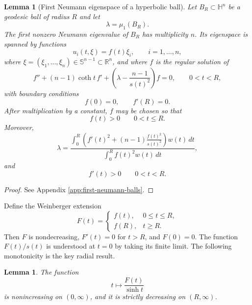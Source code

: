 \documentclass[11pt]{amsart}
\newtheorem{lemma}[theorem]{Lemma}
\theoremstyle{remark}
\newcommand{\HH}{\mathbb H}
\newcommand{\RR}{\mathbb R}
\newcommand{\Sn}{\mathbb S}
\begin{document}
\begin{lemma}[First Neumann eigenspace of a hyperbolic ball]\label{lem:hyperbolic-ball-facts}
Let $B_R\subset\HH^n$ be a geodesic ball of radius $R$ and let
$$
        \lambda=\mu_1(B_R).
$$
The first nonzero Neumann eigenvalue of $B_R$ has multiplicity $n$.  Its eigenspace is spanned by functions
$$
        u_i(t,\xi)=f(t)\xi_i,
        \qquad i=1,\dots,n,
$$
where $\xi=(\xi_1,\dots,\xi_n)\in\Sn^{n-1}\subset\RR^n$, and where $f$ is the regular solution of
\begin{equation}\label{eq:hyperbolic-ball-ode}
        f''+(n-1)\coth t\,f'
        +\left(\lambda-\frac{n-1}{s(t)^2}\right)f=0,
        \qquad 0<t<R,
\end{equation}
with boundary conditions
\begin{equation}\label{eq:hyperbolic-ball-bc}
        f(0)=0,
        \qquad
        f'(R)=0.
\end{equation}
After multiplication by a constant, $f$ may be chosen so that
$$
        f(t)>0\qquad 0<t\le R.
$$
Moreover,
\begin{equation}\label{eq:hyperbolic-ball-rayleigh}
        \lambda
        =\frac{\displaystyle\int_0^R\left(f'(t)^2+(n-1)\frac{f(t)^2}{s(t)^2}\right)w(t)\,dt}
        {\displaystyle\int_0^R f(t)^2w(t)\,dt},
\end{equation}
and
\begin{equation}\label{eq:hyperbolic-f-prime-positive}
        f'(t)>0\qquad 0<t<R.
\end{equation}
\end{lemma}

\begin{proof}
See Appendix \ref{app:first-neumann-balls}.
\end{proof}

Define the Weinberger extension
\begin{equation}\label{eq:hyperbolic-F-def}
        F(t)=
        \begin{cases}
        f(t),&0\le t\le R,\\
        f(R),&t\ge R.
        \end{cases}
\end{equation}
Then $F$ is nondecreasing, $F'(t)=0$ for $t>R$, and $F(0)=0$.  The function $F(t)/s(t)$ is understood at $t=0$ by taking its finite limit.  The following monotonicity is the key radial result.

\begin{lemma}\label{lem:hyperbolic-F-over-sinh}
The function
$$
        t\longmapsto \frac{F(t)}{\sinh t}
$$
is nonincreasing on $(0,\infty)$, and it is strictly decreasing on $(R,\infty)$.
\end{lemma}
\end{document}
